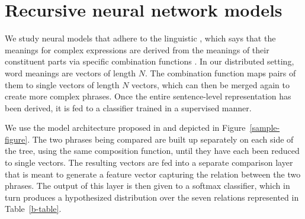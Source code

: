 
\section{Recursive neural network models} \label{methods}

We study neural models that adhere to the linguistic , which says that the meanings for complex
expressions are derived from the meanings of their constituent parts
via specific combination functions \cite{Partee84,Janssen97}. In our
distributed setting, word meanings are vectors of length $N$. The
combination function maps pairs of them to single vectors of length $N$
vectors, which can then be merged again to create more complex
phrases. Once the entire sentence-level representation has been
derived, it is fed to a classifier trained in a supervised manner.


We use the model architecture proposed in \cite{bowman2013can} and
depicted in Figure~\ref{sample-figure}. The two phrases being compared
are built up separately on each side of the tree, using the same
composition function, until they have each been reduced to single
vectors. The resulting vectors are fed into a separate comparison
layer that is meant to generate a feature vector capturing the
relation between the two phrases. The output of this layer is then
given to a softmax classifier, which in turn produces a hypothesized
distribution over the seven relations represented in Table~\ref{b-table}.


